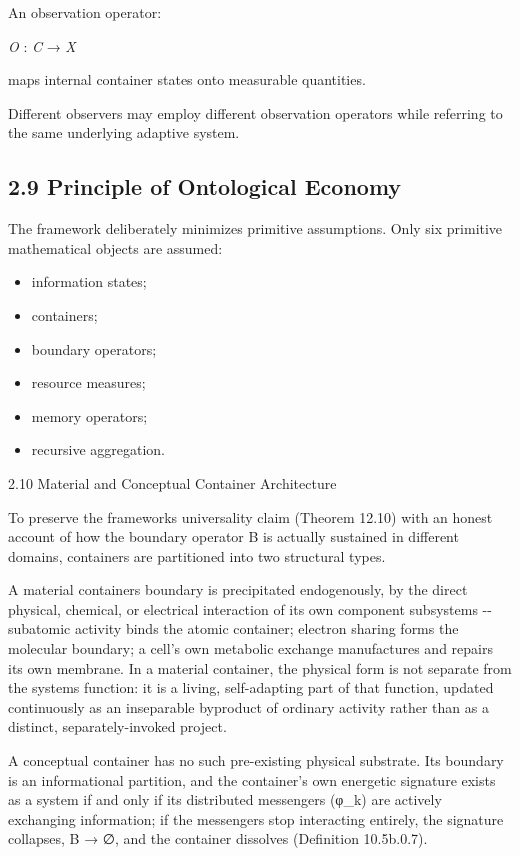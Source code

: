 \documentclass[
]{article}
\begin{document}
An observation operator:

\emph{O} : \emph{C} → \emph{X}

maps internal container states onto measurable quantities.

Different observers may employ different observation operators while
referring to the same underlying adaptive system.

\hypertarget{principle-of-ontological-economy}{%
\subsection{2.9 Principle of Ontological
Economy}\label{principle-of-ontological-economy}}

The framework deliberately minimizes primitive assumptions. Only six
primitive mathematical objects are assumed:

\begin{itemize}
\item
  information states;
\item
  containers;
\item
  boundary operators;
\item
  resource measures;
\item
  memory operators;
\item
  recursive aggregation.
\end{itemize}

2.10 Material and Conceptual Container Architecture

To preserve the frameworks universality claim (Theorem 12.10) with an
honest account of how the boundary operator B is actually sustained in
different domains, containers are partitioned into two structural types.

A material containers boundary is precipitated endogenously, by the
direct physical, chemical, or electrical interaction of its own
component subsystems -\/- subatomic activity binds the atomic container;
electron sharing forms the molecular boundary; a cell's own metabolic
exchange manufactures and repairs its own membrane. In a material
container, the physical form is not separate from the systems function:
it is a living, self-adapting part of that function, updated
continuously as an inseparable byproduct of ordinary activity rather
than as a distinct, separately-invoked project.

A conceptual container has no such pre-existing physical substrate. Its
boundary is an informational partition, and the container's own energetic
signature exists as a system if and only if its distributed messengers
(φ\_k) are actively exchanging information; if the messengers stop
interacting entirely, the signature collapses, B → ∅, and the container
dissolves (Definition 10.5b.0.7).
\end{document}
